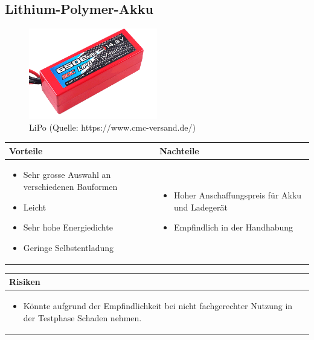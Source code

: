 \pagebreak


\subsection{Lithium-Polymer-Akku}


\begin{figure}[h!]%
\centering
\includegraphics[width=0.5\textwidth]{fig/lipo.png}
\caption{LiPo (Quelle: https://www.cmc-versand.de/)}
\label{fig:Java}
\end{figure}

\begin{table}[h]
\begin{tabular}{p{} | p{}}


 \textbf{Vorteile} & \textbf{Nachteile} \\ \hline
	 
\begin{itemize}
\item Sehr grosse Auswahl an verschiedenen Bauformen
\item Leicht
\item Sehr hohe Energiedichte
\item Geringe Selbstentladung
\end{itemize}

 
 &
 
\begin{itemize}
\item Hoher Anschaffungspreis für Akku und Ladegerät
\item Empfindlich in der Handhabung
\end{itemize}

\end{tabular}
\end{table}

\begin{table}[h]
\begin{tabular}{p{}p{}}


 \textbf{Risiken} & \\ \hline
	 
\begin{itemize}
\item Könnte aufgrund der Empfindlichkeit bei nicht fachgerechter Nutzung in der Testphase Schaden nehmen.
\end{itemize}

 
\end{tabular}
\end{table}

\pagebreak